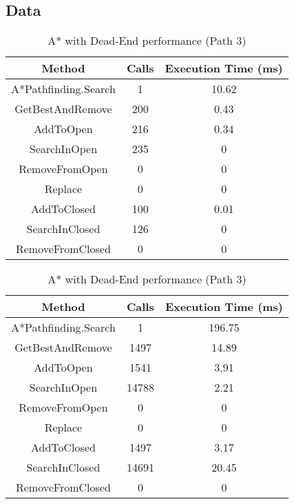 \documentclass{article}
\begin{document}
  \subsection{Data}
  \begin{table}[h!]
    \parbox{.45\linewidth}{
      \centering
      \caption{A* with Dead-End performance (Path 2)}
      \label{tab:tableDeadEnd2}
      \begin{tabular}{c|c|c}
        \textbf{Method} & \textbf{Calls} & \textbf{Execution Time (ms)}\\
        \hline
        A*Pathfinding.Search  & 1 & 10.62\\
        GetBestAndRemove & 200 & 0.43\\
        AddToOpen & 216 & 0.34\\
        SearchInOpen & 235 & 0\\
        RemoveFromOpen & 0 & 0\\
        Replace & 0 & 0\\
        AddToClosed & 100  & 0.01\\
        SearchInClosed & 126 & 0\\
        RemoveFromClosed & 0 & 0\\
      \end{tabular}
    }
    \hfil
    \parbox{.45\linewidth}{
      \centering
      \caption{A* with Dead-End performance (Path 3)}
      \label{tab:tableDeadEnd3}
      \begin{tabular}{c|c|c}
        \textbf{Method} & \textbf{Calls} & \textbf{Execution Time (ms)}\\
        \hline
        A*Pathfinding.Search  & 1 & 196.75\\
        GetBestAndRemove & 1497 & 14.89\\
        AddToOpen & 1541 & 3.91\\
        SearchInOpen & 14788 & 2.21\\
        RemoveFromOpen & 0 & 0\\
        Replace & 0 & 0\\
        AddToClosed & 1497 & 3.17\\
        SearchInClosed & 14691 & 20.45\\
        RemoveFromClosed & 0 & 0\\
      \end{tabular}
    }
  \end{table}
\end{document}
